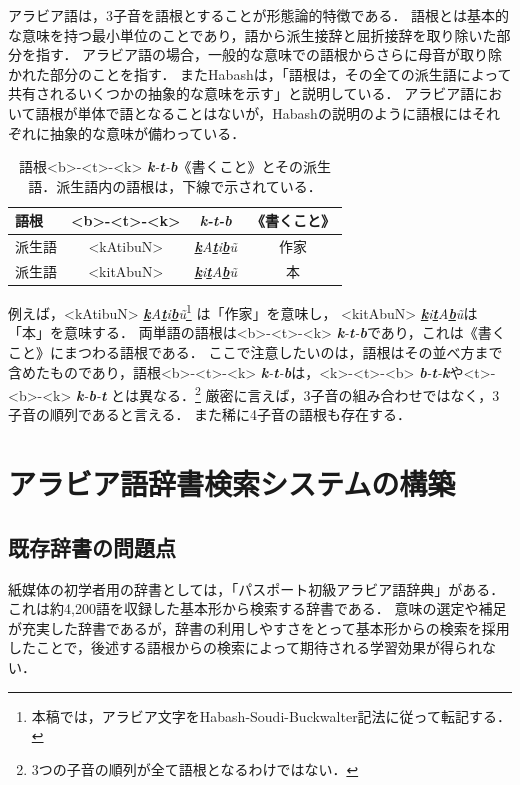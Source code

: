\documentclass[technicalreport]{ieicej}
\begin{document}
アラビア語は，3子音を語根とすることが形態論的特徴である．
語根とは基本的な意味を持つ最小単位のことであり，語から派生接辞と屈折接辞を取り除いた部分を指す\cite{nishihara2012}．
アラビア語の場合，一般的な意味での語根からさらに母音が取り除かれた部分のことを指す．
またHabash\cite{habash2010}は，「語根は，その全ての派生語によって共有されるいくつかの抽象的な意味を示す」と説明している．
アラビア語において語根が単体で語となることはないが，Habashの説明のように語根にはそれぞれに抽象的な意味が備わっている．

\begin{table}[ht]
\begin{center}
\begin{tabular}{l|ccc}
   語根& <b>-<t>-<k> & \textit{\textbf{k}-\textbf{t}-\textbf{b}} & 《書くこと》\\
  \hline
 派生語& <kAtibuN> & \textit{\underline{\textbf{k}}A\underline{\textbf{t}}i\underline{\textbf{b}}\~u} & 作家\\
  派生語& <kitAbuN> & \textit{\underline{\textbf{k}}i\underline{\textbf{t}}A\underline{\textbf{b}}\~u} & 本\\
\hline
\end{tabular}
\caption{語根<b>-<t>-<k> \textit{\textbf{k}-\textbf{t}-\textbf{b}}《書くこと》とその派生語．派生語内の語根は，下線で示されている．}
\label{table:alignment}
\end{center}
\end{table}

例えば，<kAtibuN> \textit{\underline{\textbf{k}}A\underline{\textbf{t}}i\underline{\textbf{b}}\~u}\footnote{本稿では，アラビア文字をHabash-Soudi-Buckwalter記法に従って転記する．} は「作家」を意味し， <kitAbuN> \textit{\underline{\textbf{k}}i\underline{\textbf{t}}A\underline{\textbf{b}}\~u}は「本」を意味する．
両単語の語根は<b>-<t>-<k> \textit{\textbf{k}-\textbf{t}-\textbf{b}}であり，これは《書くこと》にまつわる語根である．
ここで注意したいのは，語根はその並べ方まで含めたものであり，語根<b>-<t>-<k> \textit{\textbf{k}-\textbf{t}-\textbf{b}}は，<k>-<t>-<b> \textit{\textbf{b}-\textbf{t}-\textbf{k}}や<t>-<b>-<k> \textit{\textbf{k}-\textbf{b}-\textbf{t}} とは異なる．\footnote{3つの子音の順列が全て語根となるわけではない．}
厳密に言えば，3子音の組み合わせではなく，3子音の順列であると言える．
また稀に4子音の語根も存在する．

\section{アラビア語辞書検索システムの構築}
\subsection{既存辞書の問題点}
紙媒体の初学者用の辞書としては，「パスポート初級アラビア語辞典」がある．
これは約4,200語を収録した基本形から検索する辞書である．
意味の選定や補足が充実した辞書であるが，辞書の利用しやすさをとって基本形からの検索を採用したことで，後述する語根からの検索によって期待される学習効果が得られない．
\end{document}
